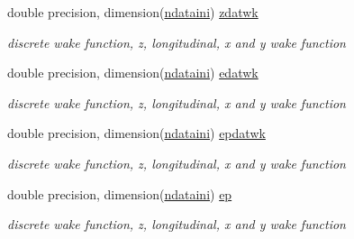 \textbf{ }\par
\begin{DoxyCompactItemize}
\item 
double precision, dimension(\mbox{\hyperlink{namespacedataclass_a2578bbe9c4dc0892ee08a8619cd7e978}{ndataini}}) \mbox{\hyperlink{namespacedataclass_aedbb605bbae521fa94b55a592eaf5802}{zdatwk}}
\begin{DoxyCompactList}\small\item\em discrete wake function, z, longitudinal, x and y wake function \end{DoxyCompactList}\item 
double precision, dimension(\mbox{\hyperlink{namespacedataclass_a2578bbe9c4dc0892ee08a8619cd7e978}{ndataini}}) \mbox{\hyperlink{namespacedataclass_aa19cbc20e7c55cc7625fe414eb6283d7}{edatwk}}
\begin{DoxyCompactList}\small\item\em discrete wake function, z, longitudinal, x and y wake function \end{DoxyCompactList}\item 
double precision, dimension(\mbox{\hyperlink{namespacedataclass_a2578bbe9c4dc0892ee08a8619cd7e978}{ndataini}}) \mbox{\hyperlink{namespacedataclass_a0efc01b23a17c274db7c427517e41e22}{epdatwk}}
\begin{DoxyCompactList}\small\item\em discrete wake function, z, longitudinal, x and y wake function \end{DoxyCompactList}\item 
double precision, dimension(\mbox{\hyperlink{namespacedataclass_a2578bbe9c4dc0892ee08a8619cd7e978}{ndataini}}) \mbox{\hyperlink{namespacedataclass_ab79752b3c2a7160b76ff3430350e23e3}{ep}}
\begin{DoxyCompactList}\small\item\em discrete wake function, z, longitudinal, x and y wake function \end{DoxyCompactList}\end{DoxyCompactItemize}

